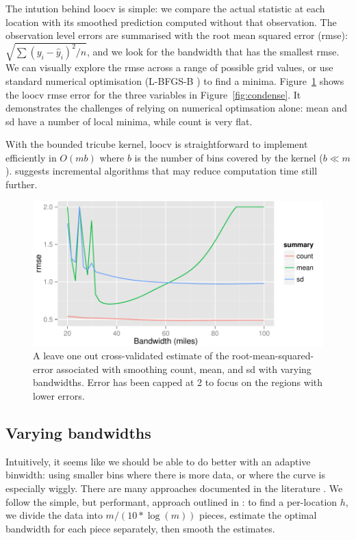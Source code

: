 \documentclass[journal]{vgtc}                %
\begin{document}
The intution behind {\sc loocv} is simple: we compare the actual statistic at each location with its smoothed prediction computed without that observation. The observation level errors are summarised with the root mean squared error (rmse): $\sqrt{ \sum (y_i - \hat{y}_i)^2 / n}$, and we look for the bandwidth that has the smallest rmse. We can visually explore the rmse across a range of possible grid values, or use standard numerical optimisation (L-BFGS-B \citep{byrd:1995}) to find a minima. Figure~\ref{fig:smooth-rmse} shows the {\sc loocv} rmse error for the three variables in Figure~\ref{fig:condense}. It demonstrates the challenges of relying on numerical optimsation alone: mean and sd have a number of local minima, while count is very flat.

With the bounded tricube kernel, {\sc loocv} is straightforward to implement efficiently in $O(m b)$ where $b$ is the number of bins covered by the kernel ($b \ll m$). \citep{fan:1994} suggests incremental algorithms that may reduce computation time still further.

\begin{figure}[htb]
 \centering
 \includegraphics[width=\linewidth]{smooth-rmse}
 \caption{A leave one out cross-validated estimate of the root-mean-squared-error associated with smoothing count, mean, and sd with varying bandwidths. Error has been capped at 2 to focus on the regions with lower errors.}
 \label{fig:smooth-rmse}
\end{figure}


\subsection{Varying bandwidths}

Intuitively, it seems like we should be able to do better with an adaptive binwidth: using smaller bins where there is more data, or where the curve is especially wiggly. There are many approaches documented in the literature  \citep{terrell:1992, brockmann:1993,schucany:1995,herrmann:1997}. We follow the simple, but performant, approach outlined in \citep{fan:1995}: to find a per-location $h$, we divide the data into $m / (10 * \log(m))$ pieces, estimate the optimal bandwidth for each piece separately, then smooth the estimates.
\end{document}
